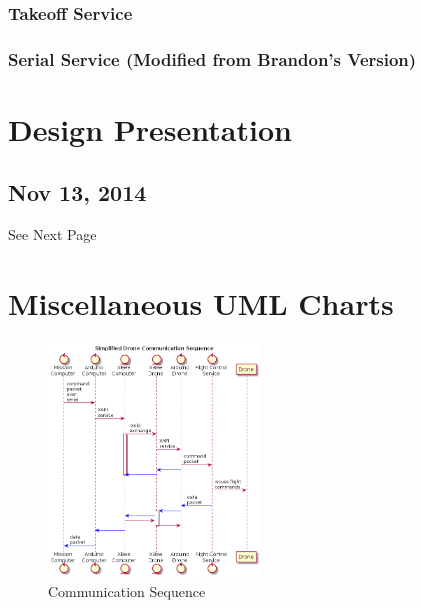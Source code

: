 \documentclass[pdftex,11pt]{article}
\begin{document}
		\subsubsection{Takeoff Service}
			
					
		\subsubsection{Serial Service (Modified from Brandon's Version)}
			
				

\clearpage


\section{Design Presentation}
\label{sec:DesignPresentation}
\subsection{Nov 13, 2014}
See Next Page









\clearpage
\appendix
\appendixpage	
\addappheadtotoc

\section{Miscellaneous UML Charts}
\label{sec:appUML}
\begin{figure}[!h]
	\centering
		\includegraphics[width=0.5\textwidth]{./plantUML/droneControlSequence.png}
	\caption{Communication Sequence}
	\label{fig:comseq}
\end{figure}
\end{document}
